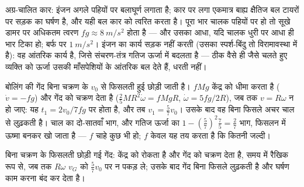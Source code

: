 \begin{example}[कार को त्वरित होने के लिए घर्षण क्यों चाहिए]\label{ex:b2:rigid-body-mechanics:car}
अग्र-चालित कार: इंजन अगले पहियों पर बलाघूर्ण लगाता है; कार पर लगा
एकमात्र बाह्य क्षैतिज बल टायरों पर सड़क का घर्षण है, और यही बल कार को
त्वरित करता है। पूरा भार चालक पहियों पर हो तो सूखे डामर पर अधिकतम त्वरण
$fg \approx \qty{8}{m/s^2}$ होता है --- और उसका आधा, यदि चालक धुरी पर
आधा ही भार टिका हो; बर्फ पर $\qty{1}{m/s^2}$। इंजन का कार्य सड़क नहीं करती
(उसका स्पर्श-बिंदु तो विरामावस्था में है): वह आंतरिक कार्य है, जिसे
संचरण-तंत्र गतिज ऊर्जा में बदलता है --- ठीक वैसे ही जैसे चलते हुए
व्यक्ति को ऊर्जा उसकी माँसपेशियों के आंतरिक बल देते हैं, धरती नहीं।
\end{example}

\begin{example}[फिसलन से लुढ़कन तक]\label{ex:b2:rigid-body-mechanics:bowling}
बोलिंग की गेंद बिना चक्रण के $v_0$ से फिसलती हुई छोड़ी जाती है।  $fMg$ केंद्र को धीमा करता है ($\dot v = -fg$) और गेंद को चक्रण देता है
($\tfrac25MR^2\dot\omega = fMgR$, $\dot\omega = 5fg/2R$), जब तक $v = R\omega$ न हो जाए:
यह $t_1 = 2v_0/7fg$ पर होता है, और तब $v_1 = \tfrac57v_0$। उसके बाद वह
बिना फिसले अचर चाल से लुढ़कती है। चाल का दो-सातवाँ भाग, और गतिज ऊर्जा का
$1 - (\tfrac57)^2\tfrac75 = \tfrac27$ भाग, फिसलन में ऊष्मा बनकर खो जाता है
--- $f$ चाहे कुछ भी हो; $f$ केवल यह तय करता है कि कितनी जल्दी।
\end{example}

\begin{omfigure}

{\small बिना चक्रण के फिसलती छोड़ी गई गेंद:  केंद्र को रोकता है
और गेंद को चक्रण देता है, समय में रैखिक रूप से, जब तक $R\omega$
$v_G$ को $\tfrac57v_0$ पर न पकड़ ले; उसके बाद गेंद बिना फिसले लुढ़कती है
और घर्षण काम करना बंद कर देता है।}
\end{omfigure}

